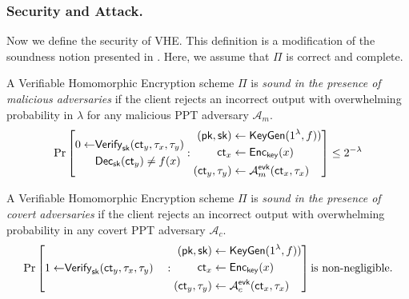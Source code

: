 \documentclass[runningheads]{llncs}
\newcommand{\cc}[1]{\mathcal{#1}} %
\newcommand{\ct}{\textsf{ct}{}}
\newcommand{\sk}{\textsf{sk}{}}
\newcommand{\evk}{\textsf{evk}}
\newcommand{\pk}{\textsf{pk}{}}
\newcommand{\dec}{\textsf{Dec}}
\newcommand{\enc}{\textsf{Enc}}
\begin{document}
        \subsubsection{Security and Attack.} Now we define the security of VHE. This definition is a modification of the soundness notion presented in \cite{vFHE}. Here, we assume that $\Pi$ is correct and complete.
        \begin{definition}\label{def:VHE_Soundness_Malicious}
        A Verifiable Homomorphic Encryption scheme $\Pi$ is \emph{sound in the presence of malicious adversaries} if the client rejects an incorrect output with overwhelming probability in $\lambda$ for any malicious PPT adversary $\cc A_m$.
            \[
                \Pr\left[
                \begin{aligned}
                    0\gets&{\sf Verify}_{\sf sk}(\ct_y,\tau_x,\tau_y)\\
                    &\dec_{\sk}(\ct_y)\neq f(x)
                \end{aligned}
                :                    
                \begin{aligned}
                        (\pk, \sk) &\gets \mathsf{KeyGen}(1^\lambda,f))\\
                        \ct_x &\gets \enc_{\mathsf{key}}(x)\\
                        (\ct_y,\tau_y) &\gets \cc A^{\evk}_m(\ct_x, \tau_x)\\
                \end{aligned}
                \right]\leq2^{-\lambda}
            \]         
        \end{definition}
        
        \begin{definition}
        \label{def:VHE_Soundness_Covert}
        A Verifiable Homomorphic Encryption scheme $\Pi$ is \emph{sound in the presence of covert adversaries} if the client rejects an incorrect output with overwhelming probability in any covert PPT adversary $\cc A_c$. 
            \[
                \Pr\left[
                \begin{aligned}
                    1\gets&{\sf Verify}_{\sf sk}(\ct_y,\tau_x,\tau_y)
                \end{aligned}
                :                    
                \begin{aligned}
                        (\pk, \sk) &\gets \mathsf{KeyGen}(1^\lambda,f))\\
                        \ct_x &\gets \enc_{\mathsf{key}}(x)\\
                        (\ct_y,\tau_y) &\gets \cc A^{\evk}_c(\ct_x, \tau_x)\\
                \end{aligned}
                \right] \text{is non-negligible.}
            \]         
        \end{definition}
        
\end{document}
